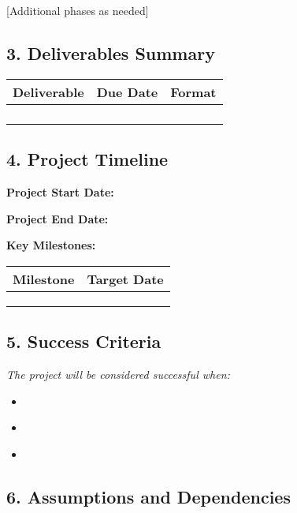 \documentclass[11pt,a4paper]{article}
\begin{document}
[Additional phases as needed]

\subsection*{3. Deliverables Summary}

\begin{tabular}{|p{5cm}|p{3cm}|p{3cm}|}
\hline
\textbf{Deliverable} & \textbf{Due Date} & \textbf{Format} \\
\hline
& & \\
\hline
& & \\
\hline
& & \\
\hline
& & \\
\hline
\end{tabular}

\subsection*{4. Project Timeline}

\textbf{Project Start Date:} \underline{\hspace{4cm}}

\textbf{Project End Date:} \underline{\hspace{4cm}}

\textbf{Key Milestones:}

\begin{tabular}{|p{6cm}|p{3cm}|}
\hline
\textbf{Milestone} & \textbf{Target Date} \\
\hline
& \\
\hline
& \\
\hline
& \\
\hline
\end{tabular}

\subsection*{5. Success Criteria}

\textit{The project will be considered successful when:}
\begin{itemize}
\item[] \underline{\hspace{12cm}}
\item[] \underline{\hspace{12cm}}
\item[] \underline{\hspace{12cm}}
\end{itemize}

\subsection*{6. Assumptions and Dependencies}
\end{document}
